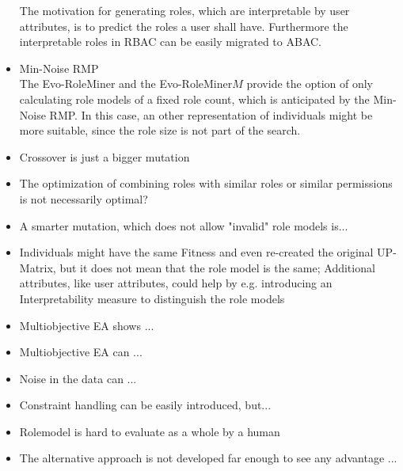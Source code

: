 \begin{itemize}
    The motivation for generating roles, which are interpretable by user attributes, is to predict the roles a user shall have. Furthermore the interpretable roles in RBAC can be easily migrated to ABAC.
    
    \item Min-Noise RMP\\
    The Evo-RoleMiner and the Evo-RoleMiner$M$ provide the option of only calculating role models of a fixed role count, which is anticipated by the Min-Noise RMP. In this case, an other representation of individuals might be more suitable, since the role size is not part of the search.
    
    
    \item Crossover is just a bigger mutation
    \item The optimization of combining roles with similar roles or similar permissions is not necessarily optimal?
    \item A smarter mutation, which does not allow "invalid" role models is...
    
    
    \item Individuals might have the same Fitness and even re-created the original UP-Matrix, but it does not mean that the role model is the same; Additional attributes, like user attributes, could help by e.g. introducing an Interpretability measure to distinguish the role models
    
	\item Multiobjective EA shows ...
	\item Multiobjective EA can ...
	\item Noise in the data can ...
	\item Constraint handling can be easily introduced, but...
	\item Rolemodel is hard to evaluate as a whole by a human
    \item The alternative approach is not developed far enough to see any advantage ...
\end{itemize}